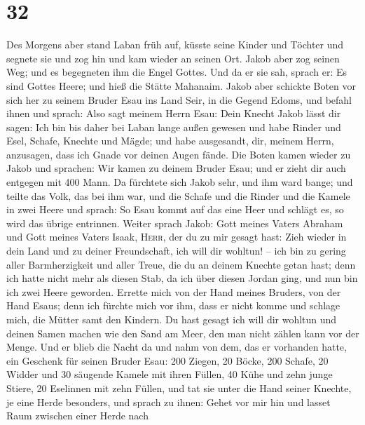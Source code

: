 \hypertarget{section-31}{%
\section{32}\label{section-31}}

 Des Morgens aber stand Laban früh auf, küsste seine
Kinder und Töchter und segnete sie und zog hin und kam wieder an seinen
Ort.  Jakob aber zog seinen Weg; und es begegneten ihm die
Engel Gottes.  Und da er sie sah, sprach er: Es sind
Gottes Heere; und hieß die Stätte Mahanaim.  Jakob aber
schickte Boten vor sich her zu seinem Bruder Esau ins Land Seir, in die
Gegend Edoms,  und befahl ihnen und sprach: Also sagt
meinem Herrn Esau: Dein Knecht Jakob lässt dir sagen: Ich bin bis daher
bei Laban lange außen gewesen  und habe Rinder und Esel,
Schafe, Knechte und Mägde; und habe ausgesandt, dir, meinem Herrn,
anzusagen, dass ich Gnade vor deinen Augen fände.  Die
Boten kamen wieder zu Jakob und sprachen: Wir kamen zu deinem Bruder
Esau; und er zieht dir auch entgegen mit 400 Mann.  Da
fürchtete sich Jakob sehr, und ihm ward bange; und teilte das Volk, das
bei ihm war, und die Schafe und die Rinder und die Kamele in zwei Heere
 und sprach: So Esau kommt auf das eine Heer und schlägt
es, so wird das übrige entrinnen.  Weiter sprach Jakob:
Gott meines Vaters Abraham und Gott meines Vaters Isaak, \textsc{Herr},
der du zu mir gesagt hast: Zieh wieder in dein Land und zu deiner
Freundschaft, ich will dir wohltun! --  ich bin zu gering
aller Barmherzigkeit und aller Treue, die du an deinem Knechte getan
hast; denn ich hatte nicht mehr als diesen Stab, da ich über diesen
Jordan ging, und nun bin ich zwei Heere geworden. 
Errette mich von der Hand meines Bruders, von der Hand Esaus; denn ich
fürchte mich vor ihm, dass er nicht komme und schlage mich, die Mütter
samt den Kindern.  Du hast gesagt ich will dir wohltun
und deinen Samen machen wie den Sand am Meer, den man nicht zählen kann
vor der Menge.  Und er blieb die Nacht da und nahm von
dem, das er vorhanden hatte, ein Geschenk für seinen Bruder Esau:
 200 Ziegen, 20 Böcke, 200 Schafe, 20 Widder
 und 30 säugende Kamele mit ihren Füllen, 40 Kühe und
zehn junge Stiere, 20 Eselinnen mit zehn Füllen,  und tat
sie unter die Hand seiner Knechte, je eine Herde besonders, und sprach
zu ihnen: Gehet vor mir hin und lasset Raum zwischen einer Herde nach
